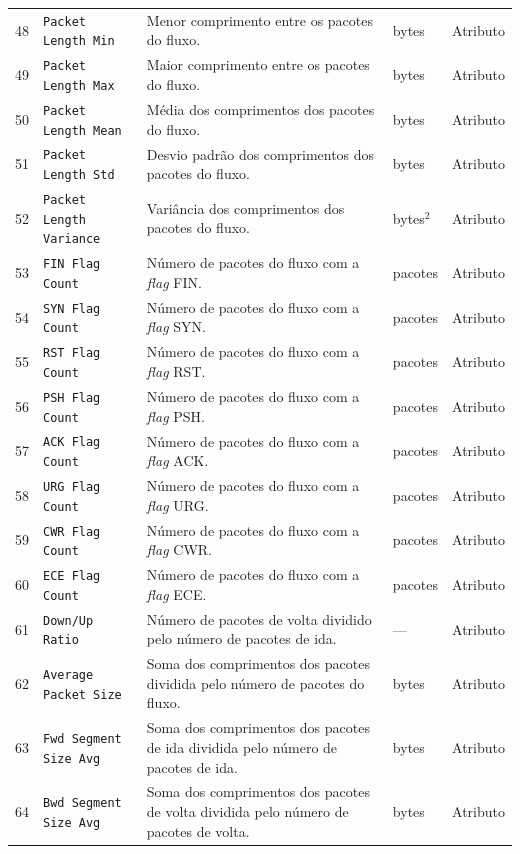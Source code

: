 \documentclass[
  12pt,
  oneside,
  a4paper,
  chapter=TITLE,
  sumario=tradicional,
  english,
  brazil
]{abntex2}
\begin{document}
\begin{apendicesenv}
\begin{longtable}{@{}r
    >{\raggedright\arraybackslash}p{4.2cm}
    >{\raggedright\arraybackslash}p{6.0cm}
    >{\raggedright\arraybackslash}p{1.7cm}
    >{\raggedright\arraybackslash}p{1.6cm}@{}}
  48 & \texttt{Packet Length Min} & Menor comprimento entre os pacotes do fluxo. & bytes & Atributo \\
  49 & \texttt{Packet Length Max} & Maior comprimento entre os pacotes do fluxo. & bytes & Atributo \\
  50 & \texttt{Packet Length Mean} & Média dos comprimentos dos pacotes do fluxo. & bytes & Atributo \\
  51 & \texttt{Packet Length Std} & Desvio padrão dos comprimentos dos pacotes do fluxo. & bytes & Atributo \\
  52 & \texttt{Packet Length Variance} & Variância dos comprimentos dos pacotes do fluxo. & bytes$^2$ & Atributo \\
  53 & \texttt{FIN Flag Count} & Número de pacotes do fluxo com a \emph{flag} FIN. & pacotes & Atributo \\
  54 & \texttt{SYN Flag Count} & Número de pacotes do fluxo com a \emph{flag} SYN. & pacotes & Atributo \\
  55 & \texttt{RST Flag Count} & Número de pacotes do fluxo com a \emph{flag} RST. & pacotes & Atributo \\
  56 & \texttt{PSH Flag Count} & Número de pacotes do fluxo com a \emph{flag} PSH. & pacotes & Atributo \\
  57 & \texttt{ACK Flag Count} & Número de pacotes do fluxo com a \emph{flag} ACK. & pacotes & Atributo \\
  58 & \texttt{URG Flag Count} & Número de pacotes do fluxo com a \emph{flag} URG. & pacotes & Atributo \\
  59 & \texttt{CWR Flag Count} & Número de pacotes do fluxo com a \emph{flag} CWR. & pacotes & Atributo \\
  60 & \texttt{ECE Flag Count} & Número de pacotes do fluxo com a \emph{flag} ECE. & pacotes & Atributo \\
  61 & \texttt{Down/Up Ratio} & Número de pacotes de volta dividido pelo número de pacotes de ida. & --- & Atributo \\
  62 & \texttt{Average Packet Size} & Soma dos comprimentos dos pacotes dividida pelo número de pacotes do fluxo. & bytes & Atributo \\
  63 & \texttt{Fwd Segment Size Avg} & Soma dos comprimentos dos pacotes de ida dividida pelo número de pacotes de ida. & bytes & Atributo \\
  64 & \texttt{Bwd Segment Size Avg} & Soma dos comprimentos dos pacotes de volta dividida pelo número de pacotes de volta. & bytes & Atributo \\

\end{longtable}
\end{apendicesenv}
\end{document}
